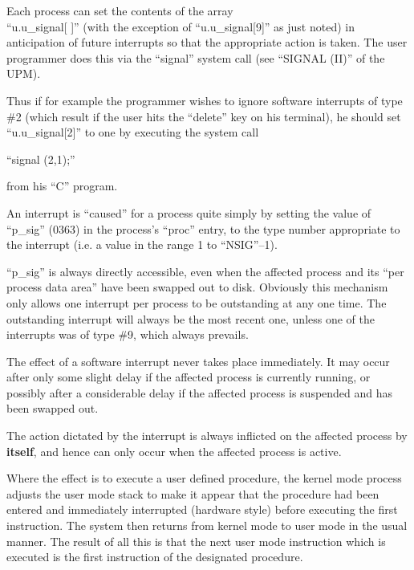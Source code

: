 
Each process can set the contents of
the array\\
``u.u\_signal[ ]'' (with the
exception of ``u.u\_signal[9]'' as just
noted) in anticipation of future interrupts so that the appropriate action is
taken. The user programmer does this
via the ``signal'' system call (see ``SIGNAL (II)'' of the UPM).

Thus if for example the programmer
wishes to ignore software interrupts of
type \#2 (which result if the user hits
the ``delete'' key on his terminal), he
should set ``u.u\_signal[2]'' to one by
executing the system call

\begin{center}
 ``signal (2,1);''
\end{center}

\noindent from his ``C'' program.



An interrupt is ``caused'' for a process
quite simply by setting the value of
``p\_sig'' (0363) in the process's ``proc''
entry, to the type number appropriate
to the interrupt (i.e. a value in the
range 1 to ``NSIG''--1).

``p\_sig'' is always directly accessible,
even when the affected process and its
``per process data area'' have been
swapped out to disk. Obviously this
mechanism only allows one interrupt per
process to be outstanding at any one
time. The outstanding interrupt will
always be the most recent one, unless
one of the interrupts was of type \#9,
which always prevails.



The effect of a software interrupt
never takes place immediately. It may
occur after only some slight delay if
the affected process is currently running, or possibly after a considerable
delay if the affected process is
suspended and has been swapped out.

The action dictated by the interrupt is
always inflicted on the affected process by {\bf itself}, and hence can only
occur when the affected process is
active.

Where the effect is to execute a user
defined procedure, the kernel mode process adjusts the user mode stack to
make it appear that the procedure had
been entered and immediately interrupted
(hardware style) before executing the first instruction. The system
then returns from kernel mode to user
mode in the usual manner. The result
of all this is that the next user mode
instruction which is executed is the
first instruction of the designated
procedure.

